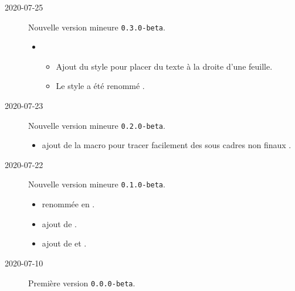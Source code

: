 \documentclass[12pt,a4paper]{article}
\begin{document}
\begin{description}
    \medskip
    \item[2020-07-25] Nouvelle version mineure \verb+0.3.0-beta+.
    
    \begin{itemize}[itemsep=.5em]
        \item {}
        \begin{itemize}[itemsep=.5em]
            \item Ajout du style  pour placer du texte à la droite d'une feuille.
    
            \item Le style  a été renommé .
        \end{itemize}
    \end{itemize}
    
    \separation

    \medskip
    \item[2020-07-23] Nouvelle version mineure \verb+0.2.0-beta+.
    
    \begin{itemize}[itemsep=.5em]
        \item {}
              ajout de la macro  pour tracer facilement des sous cadres non \og finaux \fg.
    \end{itemize}
    
    \separation

    \medskip
    \item[2020-07-22] Nouvelle version mineure \verb+0.1.0-beta+.
    
    \begin{itemize}[itemsep=.5em]
        \item {}
               renommée en  .
    
        \item {}
              ajout de .
    
        \item {}
              ajout de  et .
    \end{itemize}
    
    \separation

    \medskip
    \item[2020-07-10] Première version \verb+0.0.0-beta+.

\end{description}
\end{document}
